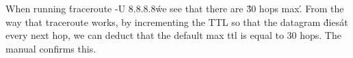 When running \'traceroute -U 8.8.8.8\' we see that there are \'30 hops max\'. From the way that traceroute works, by incrementing the TTL so that the datagram \'dies\' at every next hop, we can deduct that the default max ttl is equal to 30 hops. The manual confirms this.